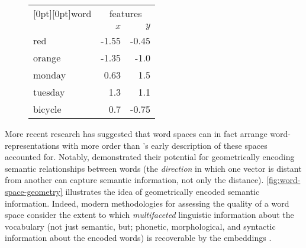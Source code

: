 \documentclass{ucetd}
\begin{document}
{\begin{example}
\begin{figure}[H]
\begin{minipage}[t]{.4\textwidth}
    \end{minipage}\hspace{4em}
    \begin{minipage}[t]{.4\textwidth}
      \centering
      \vspace{0.5em}
      \begin{tabular}{l r r}
        \toprule
        \multicolumn{1}{c}{\raisebox{-9pt}[0pt][0pt]{\quad word\quad}} & \multicolumn{2}{c}{features} \\
        \cmidrule(lr){2-3}
        \quad\quad & $x$ & $y$ \\
        \midrule
        red     & -1.55 & -0.45   \\
        orange  & -1.35 & -1.0  \\
        monday  &  0.63 &  1.5   \\
        tuesday &  1.3  &  1.1   \\
        bicycle &  0.7  & -0.75  \\
        \bottomrule
      \end{tabular}
      \vspace{0.42em}
      \label{tab:2d-wvs}
    \end{minipage}
  \end{figure}
  \vspace{-0.5em}
\end{example}
More recent research has suggested that word spaces can in fact arrange word-representations with more order than \citeauthor{shutze-1993-word-space}'s early description of these spaces accounted for. Notably, \parencite{mikolov-etal-2013-linguistic} demonstrated their potential for geometrically encoding semantic relationships between words (the \emph{direction} in which one vector is distant from another can capture semantic information, not only the distance). \autoref{fig:word-space-geometry} illustrates the idea of geometrically encoded semantic information. Indeed, modern methodologies for assessing the quality of a word space consider the extent to which \emph{multifaceted} linguistic information about the vocabulary (not just semantic, but; phonetic, morphological, and syntactic information about the encoded words) is recoverable by the embeddings \parencite{yaghoobzadeh-schutze-2016-intrinsic, wang-2019-evaluating}.
\begin{figure}[H]
  \captionsetup{width=.91\linewidth}
  \centering
  \begin{minipage}[t]{.40\textwidth}
    \centering

\end{minipage}
\end{figure}}
\end{document}
